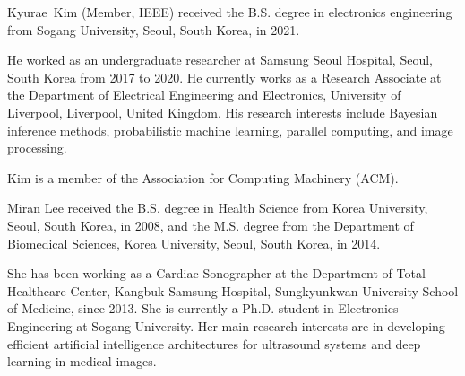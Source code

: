
\begin{IEEEbiography}{Kyurae~Kim} (Member, IEEE) received the B.S. degree in electronics engineering from Sogang University, Seoul, South Korea, in 2021.

  He worked as an undergraduate researcher at Samsung Seoul Hospital, Seoul, South Korea from 2017 to 2020.
  He currently works as a Research Associate at the Department of Electrical Engineering and Electronics, University of Liverpool, Liverpool, United Kingdom.
  His research interests include Bayesian inference methods, probabilistic machine learning, parallel computing, and image processing.

  Kim is a member of the Association for Computing Machinery (ACM).
\end{IEEEbiography}

\begin{IEEEbiography}{Miran Lee} received the B.S. degree in Health Science from Korea University, Seoul, South Korea, in 2008, and the M.S. degree from the Department of Biomedical Sciences, Korea University, Seoul, South Korea, in 2014.

  She has been working as a Cardiac Sonographer at the Department of Total Healthcare Center, Kangbuk Samsung Hospital, Sungkyunkwan University School of Medicine, since 2013.
  She is currently a Ph.D. student in Electronics Engineering at Sogang University. 
  Her main research interests are in developing efficient artificial intelligence architectures for ultrasound systems and deep learning in medical images.
\end{IEEEbiography}

